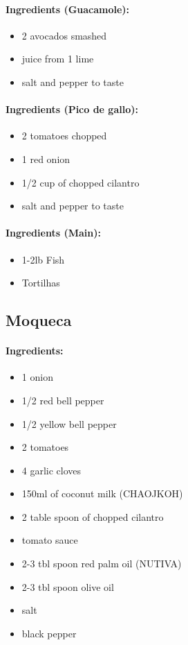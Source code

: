 \documentclass{article}
\begin{document}
\paragraph{Ingredients (Guacamole):}
\begin{itemize}
    \item 2 avocados smashed
    \item juice from 1 lime
    \item salt and pepper to taste
\end{itemize}  

\paragraph{Ingredients (Pico de gallo):}
\begin{itemize}
    \item 2 tomatoes chopped
    \item 1 red onion
    \item 1/2 cup of chopped cilantro
    \item salt and pepper to taste
\end{itemize}  

\paragraph{Ingredients (Main):}
\begin{itemize}
    \item 1-2lb Fish
    \item Tortilhas
\end{itemize} 

\subsection{Moqueca}

\paragraph{Ingredients:}
\begin{itemize}
    \item 1 onion
    \item 1/2 red bell pepper
    \item 1/2 yellow bell pepper
    \item 2 tomatoes
    \item 4 garlic cloves
    \item 150ml of coconut milk (CHAOJKOH)
    \item 2 table spoon of chopped cilantro
    \item tomato sauce
    \item 2-3 tbl spoon red palm oil (NUTIVA)
    \item 2-3 tbl spoon olive oil
    \item salt
    \item black pepper
\end{itemize}
\end{document}
